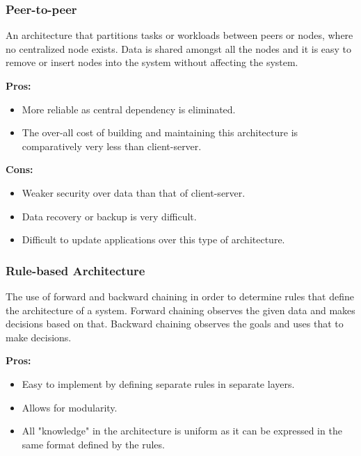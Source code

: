 \documentclass[11pt]{article}
\begin{document}
			\subsubsection{Peer-to-peer}
			
			\begin{flushleft}
				An architecture that partitions tasks or workloads between peers or nodes, where no centralized node exists. Data is shared amongst all the nodes and it is easy to remove or insert nodes into the system without affecting the system.			
			\end{flushleft}
		
			\textbf{Pros:}
			\begin{itemize}
				\item More reliable as central dependency is eliminated.
				\item The over-all cost of building and maintaining this architecture is comparatively very less than client-server.\\
			\end{itemize}
		
			\textbf{Cons:}
			\begin{itemize}
				\item Weaker security over data than that of client-server.
				\item Data recovery or backup is very difficult.
				\item Difficult to update applications over this type of architecture.
			\end{itemize}
			
			\subsubsection{Rule-based Architecture}
			
			\begin{flushleft}
				The use of forward and backward chaining in order to determine rules that define the architecture of a system. Forward chaining observes the given data and makes decisions based on that. Backward chaining observes the goals and uses that to make decisions.				
			\end{flushleft}
		
			\textbf{Pros:}
			\begin{itemize}
				\item Easy to implement by defining separate rules in separate layers.
				\item Allows for modularity.
				\item All "knowledge" in the architecture is uniform as it can be expressed in the same format defined by the rules.\\
			\end{itemize}
		
\end{document}
